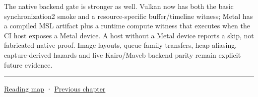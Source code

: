 The native backend gate is stronger as well. Vulkan now has both the basic synchronization2 smoke and a resource-specific buffer/timeline witness; Metal has a compiled MSL artifact plus a runtime compute witness that executes when the CI host exposes a Metal device. A host without a Metal device reports a skip, not fabricated native proof. Image layouts, queue-family transfers, heap aliasing, capture-derived hazards and live Kairo/Maveb backend parity remain explicit future evidence.

\begin{center}\rule{0.5\linewidth}{0.5pt}\end{center}

\hyperref[volume-reading-map]{Reading map} · \hyperref[06-engine-ii-ch046-game-design-from-mechanics-to-narrative-interfaces]{Previous chapter}
